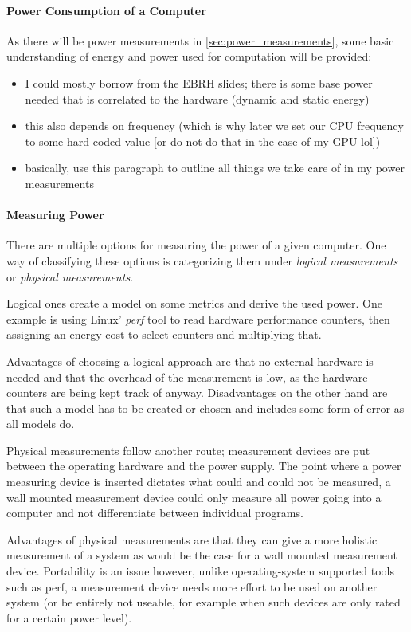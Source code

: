 \paragraph{Power Consumption of a Computer}
As there will be power measurements in \ref{sec:power_measurements}, some basic understanding of energy and power used for computation will be provided:
\begin{itemize}
    \item I could mostly borrow from the EBRH slides; there is some base power needed that is correlated to the hardware (dynamic and static energy)
    \item this also depends on frequency (which is why later we set our CPU frequency to some hard coded value [or do not do that in the case of my GPU lol])
    \item basically, use this paragraph to outline all things we take care of in my power measurements
\end{itemize}

\paragraph{Measuring Power}

There are multiple options for measuring the power of a given computer. One way of classifying these options is categorizing them under \emph{logical measurements} or \emph{physical measurements}.

Logical ones create a model on some metrics and derive the used power. One example is using Linux' \emph{perf} tool to read hardware performance counters, then assigning an energy cost to select counters and multiplying that. 

Advantages of choosing a logical approach are that no external hardware is needed and that the overhead of the measurement is low, as the hardware counters are being kept track of anyway. 
Disadvantages on the other hand are that such a model has to be created or chosen and includes some form of error as all models do.

Physical measurements follow another route; measurement devices are put between the operating hardware and the power supply. 
The point where a power measuring device is inserted dictates what could and could not be measured, a wall mounted measurement device could only measure all power going into a computer and not differentiate between individual programs.

Advantages of physical measurements are that they can give a more holistic measurement of a system as would be the case for a wall mounted measurement device. 
Portability is an issue however, unlike operating-system supported tools such as perf, a measurement device needs more effort to be used on another system (or be entirely not useable, for example when such devices are only rated for a certain power level).